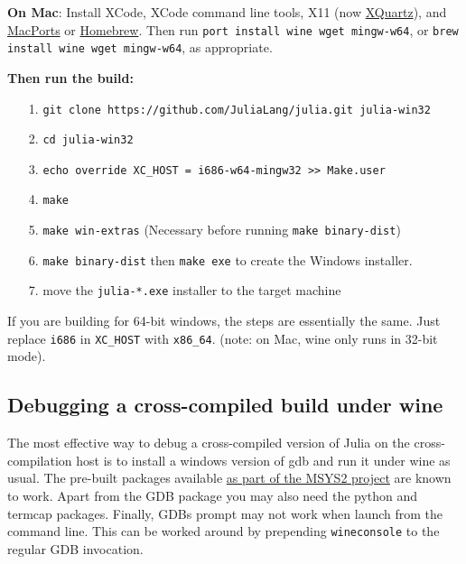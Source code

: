 \textbf{On Mac}: Install XCode, XCode command line tools, X11 (now \href{https://www.xquartz.org/}{XQuartz}), and \href{https://www.macports.org/install.php}{MacPorts} or \href{https://brew.sh/}{Homebrew}.  Then run \texttt{port install wine wget mingw-w64}, or \texttt{brew install wine wget mingw-w64}, as appropriate.



\textbf{Then run the build:}



\begin{itemize}
\item[1. ] \texttt{git clone https://github.com/JuliaLang/julia.git julia-win32}


\item[2. ] \texttt{cd julia-win32}


\item[3. ] \texttt{echo override XC\_HOST = i686-w64-mingw32 >> Make.user}


\item[4. ] \texttt{make}


\item[5. ] \texttt{make win-extras} (Necessary before running \texttt{make binary-dist})


\item[6. ] \texttt{make binary-dist} then \texttt{make exe} to create the Windows installer.


\item[7. ] move the \texttt{julia-*.exe} installer to the target machine

\end{itemize}


If you are building for 64-bit windows, the steps are essentially the same. Just replace \texttt{i686} in \texttt{XC\_HOST} with \texttt{x86\_64}. (note: on Mac, wine only runs in 32-bit mode).



\hypertarget{18405518002992942783}{}


\subsection{Debugging a cross-compiled build under wine}



The most effective way to debug a cross-compiled version of Julia on the cross-compilation host is to install a windows version of gdb and run it under wine as usual. The pre-built packages available \href{https://sourceforge.net/projects/msys2/files/REPOS/MINGW/}{as part of the MSYS2 project} are known to work. Apart from the GDB package you may also need the python and termcap packages. Finally, GDB{\textquotesingle}s prompt may not work when launch from the command line. This can be worked around by prepending \texttt{wineconsole} to the regular GDB invocation.



